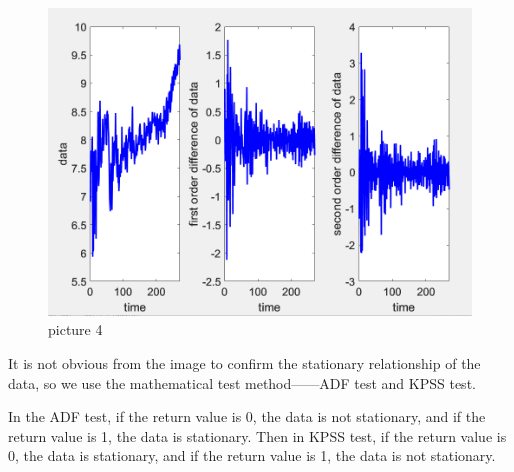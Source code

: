 \documentclass{apmcmthesis}
\begin{document}
\begin{figure}[htbp]
  \centering
  \includegraphics[scale=0.35]{Smoothness Analysis.png}
  \caption{picture 4}\label{fig5}
\end{figure}

It is not obvious from the image to confirm the stationary relationship of the data, so we use the mathematical test method——ADF test and KPSS test.

In the ADF test, if the return value is 0, the data is not stationary, and if the return value is 1, the data is stationary. Then in KPSS test, if the return value is 0, the data is stationary, and if the return value is 1, the data is not stationary.
\end{document}
